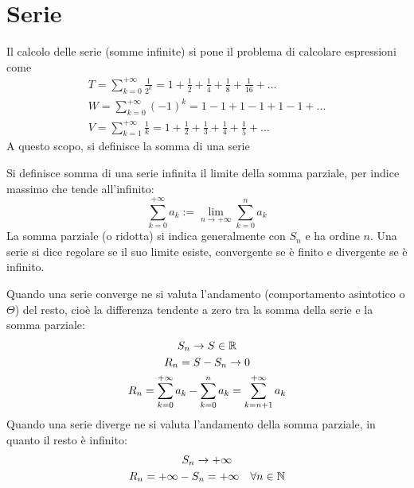 \section{Serie}
Il calcolo delle serie (somme infinite) si pone il problema di calcolare espressioni come
\begin{gather}
	\label{serie:T}
	T=\sum_{k=0}^{+\infty}\frac{1}{2^k}=1+\frac{1}{2}+\frac{1}{4}+\frac{1}{8}+\frac{1}{16}+\dots\\
	\label{serie:W}
	W=\sum_{k=0}^{+\infty}(-1)^k=1-1+1-1+1-1+\dots\\
	\label{serie:V}
	V=\sum_{k=1}^{+\infty}\frac{1}{k}=1+\frac{1}{2}+\frac{1}{3}+\frac{1}{4}+\frac{1}{5}+\dots
\end{gather}
A questo scopo, si definisce la somma di una serie
\begin{defin}
	Si definisce somma di una serie infinita il limite della somma parziale, per indice massimo che tende all'infinito:
	\[
		\sum_{k=0}^{+\infty} a_k:=\lim_{n\to+\infty}\sum_{k=0}^n a_k
	\]
	La somma parziale (o ridotta) si indica generalmente con $S_n$ e ha ordine $n$. Una serie si dice regolare se il suo limite esiste, convergente se è finito e divergente se è infinito.
\end{defin}

Quando una serie converge ne si valuta l'andamento (comportamento asintotico o $\Theta$) del resto, cioè la differenza tendente a zero tra la somma della serie e la somma parziale:
\begin{gather*}
	S_n\to S\in\mathbb{R}\\
	R_n=S-S_n\to0\\
	R_n=\sum_{k=0}^{+\infty}a_k-\sum_{k=0}^n a_k=\sum_{k=n+1}^{+\infty} a_k
\end{gather*}
Quando una serie diverge ne si valuta l'andamento della somma parziale, in quanto il resto è infinito:
\begin{gather*}
	S_n\to+\infty\\
	R_n=+\infty-S_n=+\infty\quad\forall n\in\mathbb{N}
\end{gather*}


